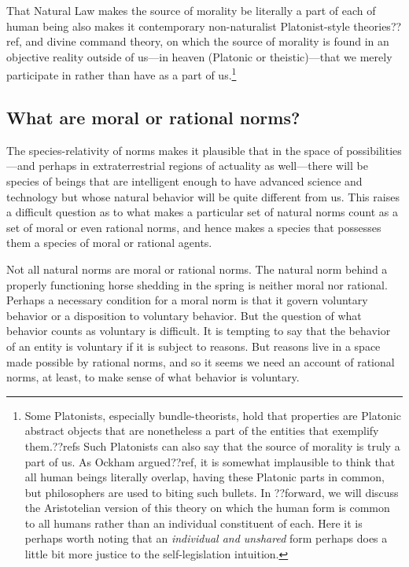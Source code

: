 That Natural Law makes the source of morality be literally a part of each of human being also makes it
contemporary non-naturalist Platonist-style theories??ref, and divine command theory, on which the source 
of morality is found in  an objective reality outside of us---in heaven (Platonic or theistic)---that we 
merely participate in rather than have as a part of us.\footnote{Some Platonists, especially bundle-theorists, 
hold that properties are Platonic abstract objects that are nonetheless a part of the entities that exemplify
them.??refs Such Platonists can also say that the source of morality is truly a part of us. As Ockham argued??ref,
it is somewhat implausible to think that all human beings literally overlap, having these Platonic parts in common, 
but philosophers are used to biting such bullets. In ??forward, we will discuss the Aristotelian version of this theory
on which the human form is common to all humans rather than an individual constituent of each. Here it is perhaps
worth noting that an \textit{individual and unshared} form perhaps does a little bit more justice to the 
self-legislation intuition.}

\subsection{What are moral or rational norms?}
The species-relativity of norms makes it plausible that in the space of possibilities---and perhaps in 
extraterrestrial regions of actuality as well---there will be species of beings that are intelligent enough to have advanced science and technology but whose natural
behavior will be quite different from us. This raises a difficult question as to what makes a particular set of
natural norms count as a set of moral or even rational norms, and hence makes a species that possesses them a species of moral 
or rational agents.

Not all natural norms are moral or rational norms. The natural norm behind a properly functioning horse shedding in the spring
is neither moral nor rational. Perhaps a necessary condition for a moral norm is that it govern voluntary behavior or a disposition to voluntary behavior.
But the question of what behavior counts as voluntary is difficult. It is tempting to say that the behavior of an entity is
voluntary if it is subject to reasons. But reasons live in a space made possible by rational norms, and so it seems we need
an account of rational norms, at least, to make sense of what behavior is voluntary.

